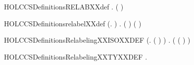 \newcommand{\HOLCCSDefinitionsIsXXRelabelingXXdef}{\UseVerbatim{HOLCCSDefinitionsIsXXRelabelingXXdef}}
\begin{SaveVerbatim}{HOLCCSDefinitionsRELABXXdef}
\HOLTokenTurnstile{} \HOLSymConst{\HOLTokenForall{}}.   \HOLSymConst{=}  ( )
\end{SaveVerbatim}
\newcommand{\HOLCCSDefinitionsRELABXXdef}{\UseVerbatim{HOLCCSDefinitionsRELABXXdef}}
\begin{SaveVerbatim}{HOLCCSDefinitionsrelabelXXdef}
\HOLTokenTurnstile{} (\HOLSymConst{\HOLTokenForall{}}.   \HOLConst{\ensuremath{\tau}} \HOLSymConst{=} \HOLConst{\ensuremath{\tau}}) \HOLSymConst{\HOLTokenConj{}}
   \HOLSymConst{\HOLTokenForall{}} .   ( ) \HOLSymConst{=}  (  )
\end{SaveVerbatim}
\newcommand{\HOLCCSDefinitionsrelabelXXdef}{\UseVerbatim{HOLCCSDefinitionsrelabelXXdef}}
\begin{SaveVerbatim}{HOLCCSDefinitionsRelabelingXXISOXXDEF}
\HOLTokenTurnstile{} (\HOLSymConst{\HOLTokenForall{}}.  ( ) \HOLSymConst{=} ) \HOLSymConst{\HOLTokenConj{}}
   \HOLSymConst{\HOLTokenForall{}}.
         \HOLSymConst{\HOLTokenEquiv{}}
       ( ( ) \HOLSymConst{=} )
\end{SaveVerbatim}
\newcommand{\HOLCCSDefinitionsRelabelingXXISOXXDEF}{\UseVerbatim{HOLCCSDefinitionsRelabelingXXISOXXDEF}}
\begin{SaveVerbatim}{HOLCCSDefinitionsRelabelingXXTYXXDEF}
\HOLTokenTurnstile{} \HOLSymConst{\HOLTokenExists{}}.   
\end{SaveVerbatim}
\newcommand{\HOLCCSDefinitionsRelabelingXXTYXXDEF}{\UseVerbatim{HOLCCSDefinitionsRelabelingXXTYXXDEF}}

